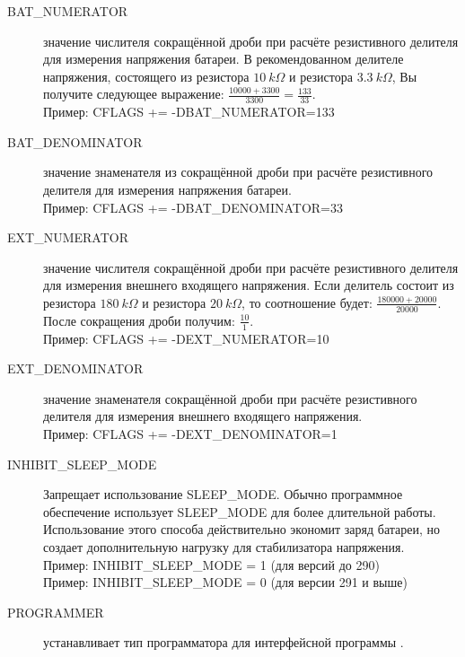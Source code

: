 \begin{description}
  \item[BAT\_NUMERATOR] значение числителя сокращённой дроби при расчёте резистивного делителя для измерения напряжения 
батареи. В рекомендованном делителе напряжения, состоящего из резистора \(10~k\Omega\) и резистора \(3.3~k\Omega\), 
Вы получите следующее выражение: \(\frac{ 10000 + 3300}{ 3300} = \frac{ 133}{ 33}\). \\
Пример: CFLAGS += -DBAT\_NUMERATOR=133

  \item[BAT\_DENOMINATOR] значение знаменателя из сокращённой дроби при расчёте резистивного делителя 
для измерения напряжения батареи. \\
Пример: CFLAGS += -DBAT\_DENOMINATOR=33

  \item[EXT\_NUMERATOR] значение числителя сокращённой дроби при расчёте резистивного делителя для измерения внешнего 
входящего напряжения.
Если делитель состоит из резистора \(180~k\Omega\) и резистора \(20~k\Omega\), то соотношение будет:
\(\frac{ 180000 + 20000}{ 20000}\).
После сокращения дроби получим: \(\frac{ 10}{ 1}\). \\
Пример: CFLAGS += -DEXT\_NUMERATOR=10

  \item[EXT\_DENOMINATOR] значение знаменателя сокращённой дроби при расчёте резистивного делителя для измерения 
внешнего входящего напряжения. \\
Пример: CFLAGS += -DEXT\_DENOMINATOR=1

  \item[INHIBIT\_SLEEP\_MODE] Запрещает использование SLEEP\_MODE. Обычно программное обеспечение 
использует SLEEP\_MODE для более длительной работы. Использование этого способа действительно экономит 
заряд батареи, но создает дополнительную нагрузку для стабилизатора напряжения.\\
Пример: INHIBIT\_SLEEP\_MODE = 1 (для версий до 290)\\
Пример: INHIBIT\_SLEEP\_MODE = 0 (для версии 291 и выше)
\label{sec:config-Prog}
  \item[PROGRAMMER] \label{PROGRAMMER}устанавливает тип программатора для интерфейсной программы .\\


\end{description}
